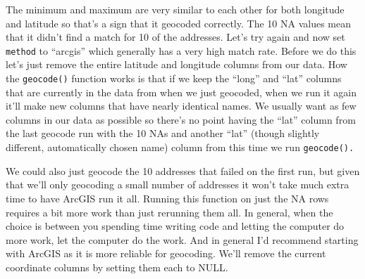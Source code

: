\documentclass[
]{krantz}
\makeatletter
\newenvironment{Shaded}{\begin{snugshade}}{\end{snugshade}}
\newcommand{\AttributeTok}[1]{\textcolor[rgb]{0.61,0.61,0.61}{#1}}
\newcommand{\CommentTok}[1]{\textcolor[rgb]{0.37,0.37,0.37}{\textit{#1}}}
\newcommand{\ConstantTok}[1]{\textcolor[rgb]{0,0,0}{#1}}
\newcommand{\FunctionTok}[1]{\textcolor[rgb]{0,0,0}{#1}}
\newcommand{\NormalTok}[1]{#1}
\newcommand{\OtherTok}[1]{\textcolor[rgb]{0.37,0.37,0.37}{#1}}
\newcommand{\SpecialCharTok}[1]{\textcolor[rgb]{0,0,0}{#1}}
\newcommand{\StringTok}[1]{\textcolor[rgb]{0.5,0.5,0.5}{#1}}
\newenvironment{kframe}{%
\medskip{}
\setlength{\fboxsep}{.8em}
 \def\at@end@of@kframe{}%
 \ifinner\ifhmode%
  \def\at@end@of@kframe{\end{minipage}}%
  \begin{minipage}{\columnwidth}%
 \fi\fi%
 \def\FrameCommand##1{\hskip\@totalleftmargin \hskip-\fboxsep
 \colorbox{shadecolor}{##1}\hskip-\fboxsep
     \hskip-\linewidth \hskip-\@totalleftmargin \hskip\columnwidth}%
 \MakeFramed {\advance\hsize-\width
   \@totalleftmargin\z@ \linewidth\hsize
   \@setminipage}}%
 {\par\unskip\endMakeFramed%
 \at@end@of@kframe}
\renewenvironment{Shaded}{\begin{kframe}}{\end{kframe}}
\makeatother
\begin{document}
\begin{Shaded}
\end{Shaded}

The minimum and maximum are very similar to each other for both longitude and latitude so that's a sign that it geocoded correctly. The 10 NA values mean that it didn't find a match for 10 of the addresses. Let's try again and now set \texttt{method} to ``arcgis'' which generally has a very high match rate. Before we do this let's just remove the entire latitude and longitude columns from our data. How the \texttt{geocode()} function works is that if we keep the ``long'' and ``lat'' columns that are currently in the data from when we just geocoded, when we run it again it'll make new columns that have nearly identical names. We usually want as few columns in our data as possible so there's no point having the ``lat'' column from the last geocode run with the 10 NAs and another ``lat'' (though slightly different, automatically chosen name) column from this time we run \texttt{geocode().}

We could also just geocode the 10 addresses that failed on the first run, but given that we'll only geocoding a small number of addresses it won't take much extra time to have ArcGIS run it all. Running this function on just the NA rows requires a bit more work than just rerunning them all. In general, when the choice is between you spending time writing code and letting the computer do more work, let the computer do the work. And in general I'd recommend starting with ArcGIS as it is more reliable for geocoding. We'll remove the current coordinate columns by setting them each to NULL.

\begin{Shaded}
\end{Shaded}
\end{document}
